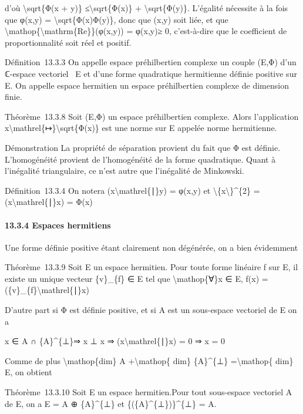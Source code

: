 \documentclass[]{article}
\begin{document}
d'où \textbackslash{}sqrt\{Φ(x + y)\} ≤\textbackslash{}sqrt\{Φ(x)\} +
\textbackslash{}sqrt\{Φ(y)\}. L'égalité nécessite à la fois que
\textbar{}φ(x,y)\textbar{} = \textbackslash{}sqrt\{Φ(x)Φ(y)\}, donc que
(x,y) soit liée, et que
\textbackslash{}mathop\{\textbackslash{}mathrm\{Re\}\}(φ(x,y)) =
\textbar{}φ(x,y)\textbar{}≥ 0, c'est-à-dire que le coefficient de
proportionnalité soit réel et positif.

Définition~13.3.3 On appelle espace préhilbertien complexe un couple
(E,Φ) d'un ℂ-espace vectoriel ~E et d'une forme quadratique hermitienne
définie positive sur E. On appelle espace hermitien un espace
préhilbertien complexe de dimension finie.

Théorème~13.3.8 Soit (E,Φ) un espace préhilbertien complexe. Alors
l'application x\textbackslash{}mathrel\{↦\}\textbackslash{}sqrt\{Φ(x)\}
est une norme sur E appelée norme hermitienne.

Démonstration La propriété de séparation provient du fait que Φ est
définie. L'homogénéité provient de l'homogénéité de la forme
quadratique. Quant à l'inégalité triangulaire, ce n'est autre que
l'inégalité de Minkowski.

Définition~13.3.4 On notera (x\textbackslash{}mathrel\{∣\}y) = φ(x,y) et
\textbackslash{}\textbar{}\{x\textbackslash{}\textbar{}\}\^{}\{2\} =
(x\textbackslash{}mathrel\{∣\}x) = Φ(x)

\paragraph{13.3.4 Espaces hermitiens}

Une forme définie positive étant clairement non dégénérée, on a bien
évidemment

Théorème~13.3.9 Soit E un espace hermitien. Pour toute forme linéaire f
sur E, il existe un unique vecteur \{v\}\_\{f\} ∈ E tel que
\textbackslash{}mathop\{∀\}x ∈ E, f(x) =
(\{v\}\_\{f\}\textbackslash{}mathrel\{∣\}x)

D'autre part si Φ est définie positive, et si A est un sous-espace
vectoriel de E on a

x ∈ A ∩ \{A\}\^{}\{⊥\}⇒ x ⊥ x ⇒ (x\textbackslash{}mathrel\{∣\}x) = 0 ⇒ x
= 0

Comme de plus \textbackslash{}mathop\{dim\} A +\textbackslash{}mathop\{
dim\} \{A\}\^{}\{⊥\} =\textbackslash{}mathop\{ dim\} E, on obtient

Théorème~13.3.10 Soit E un espace hermitien.Pour tout sous-espace
vectoriel A de E, on a E = A ⊕ \{A\}\^{}\{⊥\} et
\{(\{A\}\^{}\{⊥\})\}\^{}\{⊥\} = A.
\end{document}
